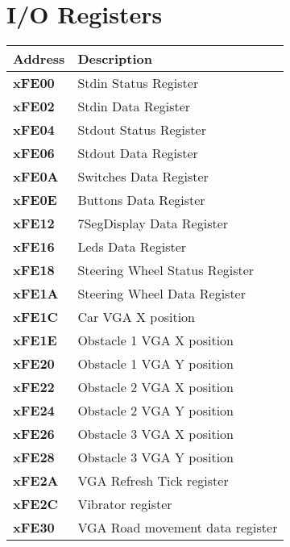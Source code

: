 \section{I/O Registers}
\begin{tabular}{| l | l |}
\hline
\textbf{Address}		& \textbf{Description}\\
\hline

\textbf{xFE00}			& Stdin Status Register\\
\textbf{xFE02}			& Stdin Data Register\\
\hline

\textbf{xFE04}			& Stdout Status Register\\
\textbf{xFE06}			& Stdout Data Register\\
\hline

\textbf{xFE0A}			& Switches Data Register\\
\textbf{xFE0E}			& Buttons Data Register\\
\textbf{xFE12}			& 7SegDisplay Data Register\\
\textbf{xFE16}			& Leds Data Register\\
\hline

\textbf{xFE18}			& Steering Wheel Status Register\\
\textbf{xFE1A}			& Steering Wheel Data Register\\
\hline

\textbf{xFE1C}			& Car VGA X position\\
\hline

\textbf{xFE1E}			& Obstacle 1 VGA X position\\
\textbf{xFE20}			& Obstacle 1 VGA Y position\\
\textbf{xFE22}			& Obstacle 2 VGA X position\\
\textbf{xFE24}			& Obstacle 2 VGA Y position\\
\textbf{xFE26}			& Obstacle 3 VGA X position\\
\textbf{xFE28}			& Obstacle 3 VGA Y position\\
\hline

\textbf{xFE2A}			& VGA Refresh Tick register\\
\hline

\textbf{xFE2C}			& Vibrator register\\
\hline

\textbf{xFE30}			& VGA Road movement data register\\
\hline

\hline
\end{tabular}